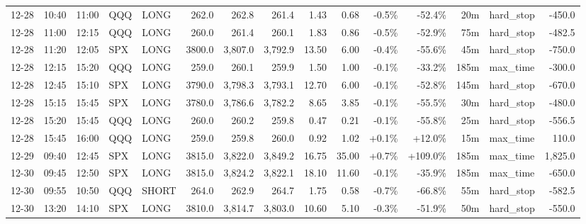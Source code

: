 \documentclass[11pt,a4paper,twoside]{article}
\begin{document}
\begin{landscape}
\begin{center}
\begin{longtable}{>{\color{txtmain}}l l l l l r r r r r r r r >{\color{txtmain}}l r}
12-28 & 10:40 & 11:00 & QQQ & LONG & 262.0 & 262.8 & 261.4 & 1.43 & 0.68 & \textcolor{lossred}{-0.5\%} & \textcolor{lossred}{-52.4\%} & 20m & hard\_stop & \textcolor{lossred}{-450.0} \\
12-28 & 11:00 & 12:15 & QQQ & LONG & 260.0 & 261.4 & 260.1 & 1.83 & 0.86 & \textcolor{lossred}{-0.5\%} & \textcolor{lossred}{-52.9\%} & 75m & hard\_stop & \textcolor{lossred}{-482.5} \\
12-28 & 11:20 & 12:05 & SPX & LONG & 3800.0 & 3,807.0 & 3,792.9 & 13.50 & 6.00 & \textcolor{lossred}{-0.4\%} & \textcolor{lossred}{-55.6\%} & 45m & hard\_stop & \textcolor{lossred}{-750.0} \\
12-28 & 12:15 & 15:20 & QQQ & LONG & 259.0 & 260.1 & 259.9 & 1.50 & 1.00 & \textcolor{lossred}{-0.1\%} & \textcolor{lossred}{-33.2\%} & 185m & max\_time & \textcolor{lossred}{-300.0} \\
12-28 & 12:45 & 15:10 & SPX & LONG & 3790.0 & 3,798.3 & 3,793.1 & 12.70 & 6.00 & \textcolor{lossred}{-0.1\%} & \textcolor{lossred}{-52.8\%} & 145m & hard\_stop & \textcolor{lossred}{-670.0} \\
12-28 & 15:15 & 15:45 & SPX & LONG & 3780.0 & 3,786.6 & 3,782.2 & 8.65 & 3.85 & \textcolor{lossred}{-0.1\%} & \textcolor{lossred}{-55.5\%} & 30m & hard\_stop & \textcolor{lossred}{-480.0} \\
12-28 & 15:20 & 15:45 & QQQ & LONG & 260.0 & 260.2 & 259.8 & 0.47 & 0.21 & \textcolor{lossred}{-0.1\%} & \textcolor{lossred}{-55.8\%} & 25m & hard\_stop & \textcolor{lossred}{-556.5} \\
12-28 & 15:45 & 16:00 & QQQ & LONG & 259.0 & 259.8 & 260.0 & 0.92 & 1.02 & \textcolor{wingreen}{+0.1\%} & \textcolor{wingreen}{+12.0\%} & 15m & max\_time & \textcolor{wingreen}{110.0} \\
12-29 & 09:40 & 12:45 & SPX & LONG & 3815.0 & 3,822.0 & 3,849.2 & 16.75 & 35.00 & \textcolor{wingreen}{+0.7\%} & \textcolor{wingreen}{+109.0\%} & 185m & max\_time & \textcolor{wingreen}{1,825.0} \\
12-30 & 09:45 & 12:50 & SPX & LONG & 3815.0 & 3,824.2 & 3,822.1 & 18.10 & 11.60 & \textcolor{lossred}{-0.1\%} & \textcolor{lossred}{-35.9\%} & 185m & max\_time & \textcolor{lossred}{-650.0} \\
12-30 & 09:55 & 10:50 & QQQ & SHORT & 264.0 & 262.9 & 264.7 & 1.75 & 0.58 & \textcolor{lossred}{-0.7\%} & \textcolor{lossred}{-66.8\%} & 55m & hard\_stop & \textcolor{lossred}{-582.5} \\
12-30 & 13:20 & 14:10 & SPX & LONG & 3810.0 & 3,814.7 & 3,803.0 & 10.60 & 5.10 & \textcolor{lossred}{-0.3\%} & \textcolor{lossred}{-51.9\%} & 50m & hard\_stop & \textcolor{lossred}{-550.0} \\

\end{longtable}
\end{center}
\end{landscape}
\end{document}
